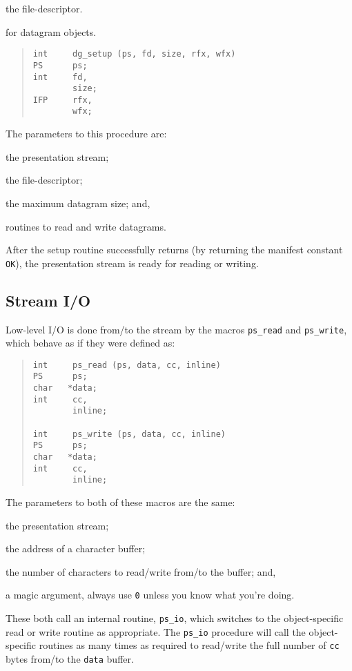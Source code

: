 \begin{describe}
\begin{describe}
\item[\verb"fd":] the file-descriptor.
\end{describe}

\item[\verb"dg\_setup":] for datagram objects.
\begin{quote}\small\begin{verbatim}
int     dg_setup (ps, fd, size, rfx, wfx)
PS      ps;
int     fd,
        size;
IFP     rfx,
        wfx;
\end{verbatim}\end{quote}
The parameters to this procedure are:
\begin{describe}
\item[\verb"ps":] the presentation stream;

\item[\verb"fd":] the file-descriptor;

\item[\verb"size":] the maximum datagram size;
and,

\item[\verb"rfx"/\verb"wfx":] routines to read and write datagrams.
\end{describe}
\end{describe}
After the setup routine successfully returns
(by returning the manifest constant \verb"OK"),
the presentation stream is ready for reading or writing.

\subsection	{Stream I/O}
Low-level I/O is done from/to the stream by the macros \verb"ps_read" and
\verb"ps_write",
which behave as if they were defined as:
\begin{quote}\small\begin{verbatim}
int     ps_read (ps, data, cc, inline)
PS      ps;
char   *data;
int     cc,
        inline;

int     ps_write (ps, data, cc, inline)
PS      ps;
char   *data;
int     cc,
        inline;
\end{verbatim}\end{quote}
The parameters to both of these macros are the same:
\begin{describe}
\item[\verb"ps":] the presentation stream;

\item[\verb"data":] the address of a character buffer;

\item[\verb"cc":] the number of characters to read/write from/to the buffer;
and,

\item[\verb"inline":] a magic argument,
always use \verb"0" unless you know what you're doing.
\end{describe}
These both call an internal routine, \verb"ps_io", which switches to the
object-specific read or write routine as appropriate.
The \verb"ps_io" procedure will call the object-specific routines as many
times as required to read/write the full number of \verb"cc" bytes from/to
the \verb"data" buffer.

